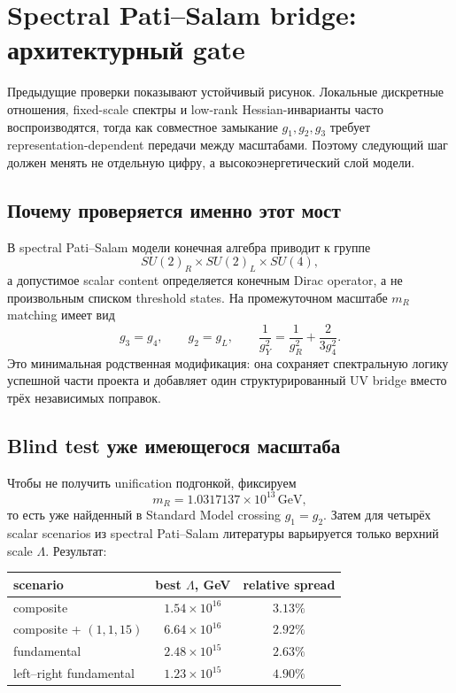 \chapter{Spectral Pati--Salam bridge: архитектурный gate}

Предыдущие проверки показывают устойчивый рисунок. Локальные дискретные
отношения, fixed-scale спектры и low-rank Hessian-инварианты часто
воспроизводятся, тогда как совместное замыкание \(g_1,g_2,g_3\) требует
representation-dependent передачи между масштабами. Поэтому следующий шаг
должен менять не отдельную цифру, а высокоэнергетический слой модели.

\section{Почему проверяется именно этот мост}

В spectral Pati--Salam модели конечная алгебра приводит к группе
\begin{equation}
 SU(2)_R\times SU(2)_L\times SU(4),
\end{equation}
а допустимое scalar content определяется конечным Dirac operator, а не
произвольным списком threshold states. На промежуточном масштабе
\(m_R\) matching имеет вид
\begin{equation}
 g_3=g_4,
 \qquad g_2=g_L,
 \qquad
 \frac{1}{g_Y^2}=\frac{1}{g_R^2}+\frac{2}{3g_4^2}.
 \label{eq:ps-bridge-matching}
\end{equation}
Это минимальная родственная модификация: она сохраняет спектральную логику
успешной части проекта и добавляет один структурированный UV bridge вместо
трёх независимых поправок.

\section{Blind test уже имеющегося масштаба}

Чтобы не получить unification подгонкой, фиксируем
\begin{equation}
 m_R=1.0317137\times10^{13}\,\mathrm{GeV},
\end{equation}
то есть уже найденный в Standard Model crossing \(g_1=g_2\). Затем для
четырёх scalar scenarios из spectral Pati--Salam литературы варьируется
только верхний scale \(\Lambda\). Результат:

\begin{center}
\begin{tabular}{lcc}
\toprule
scenario & best \(\Lambda\), GeV & relative spread \\
\midrule
composite & \(1.54\times10^{16}\) & \(3.13\%\) \\
composite + \((1,1,15)\) & \(6.64\times10^{16}\) & \(2.92\%\) \\
fundamental & \(2.48\times10^{15}\) & \(2.63\%\) \\
left--right fundamental & \(1.23\times10^{15}\) & \(4.90\%\) \\
\bottomrule
\end{tabular}
\end{center}

